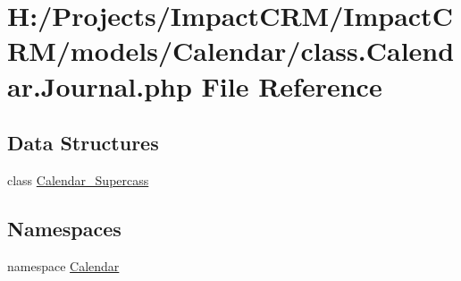 \hypertarget{class_8Calendar_8Journal_8php}{
\section{H:/Projects/ImpactCRM/ImpactCRM/models/Calendar/class.Calendar.Journal.php File Reference}
\label{class_8Calendar_8Journal_8php}
}
\subsection*{Data Structures}
\begin{DoxyCompactItemize}
\item 
class \hyperlink{classCalendar__Supercass}{Calendar\_\-Supercass}
\end{DoxyCompactItemize}
\subsection*{Namespaces}
\begin{DoxyCompactItemize}
\item 
namespace \hyperlink{namespaceCalendar}{Calendar}
\end{DoxyCompactItemize}
